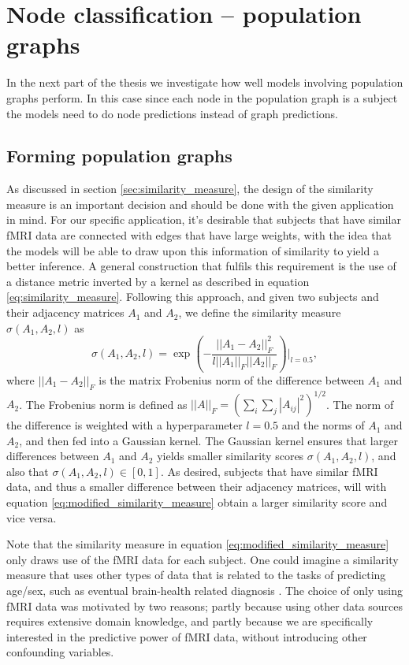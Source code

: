 \section{Node classification -- population graphs}
In the next part of the thesis we investigate how well models involving population graphs perform. In this case since each node in the population graph is a subject the models need to do node predictions instead of graph predictions. 

\subsection{Forming population graphs}

As discussed in section \ref{sec:similarity_measure}, the design of the similarity measure is an important decision and should be done with the given application in mind. For our specific application, it's desirable that subjects that have similar fMRI data are connected with edges that have large weights, with the idea that the models will be able to draw upon this information of similarity to yield a better inference. A general construction that fulfils this requirement is the use of a distance metric inverted by a kernel as described in equation \eqref{eq:similarity_measure}. Following this approach, and given two subjects and their adjacency matrices $A_1$ and $A_2$, we define the similarity measure $\sigma\left(A_1, A_2, l\right)$ as
\begin{equation}
    \sigma\left(A_1, A_2, l\right) = \exp{\left(- \frac{||A_1 - A_2||_F^2}{l||A_1||_F ||A_2||_F} \right)}\biggr\rvert_{l=0.5},
    \label{eq:modified_similarity_measure}
\end{equation}
where $||A_1 - A_2 ||_F$ is the matrix Frobenius norm of the difference between $A_1$ and $A_2$. The Frobenius norm is defined as $||A||_F = \left( \sum_i \sum_j |A_{ij}|^2 \right)^{1/2}$. The norm of the difference is weighted with a hyperparameter $l=0.5$ and the norms of $A_1$ and $A_2$, and then fed into a Gaussian kernel. The Gaussian kernel ensures that larger differences between $A_1$ and $A_2$ yields smaller similarity scores $\sigma\left(A_1, A_2, l\right)$, and also that  $\sigma\left(A_1, A_2, l\right) \in \left[0, 1\right]$. As desired, subjects that have similar fMRI data, and thus a smaller difference between their adjacency matrices, will with equation \eqref{eq:modified_similarity_measure} obtain a larger similarity score and vice versa. 

Note that the similarity measure in equation \eqref{eq:modified_similarity_measure} only draws use of the fMRI data for each subject. One could imagine a similarity measure that uses other types of data that is related to the tasks of predicting age/sex, such as eventual brain-health related diagnosis \cite{stankeviciute}. The choice of only using fMRI data was motivated by two reasons; partly because using other data sources requires extensive domain knowledge, and partly because we are specifically interested in the predictive power of fMRI data, without introducing other confounding variables.

